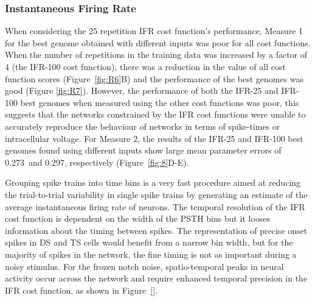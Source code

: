 \subsubsection{Instantaneous Firing Rate }\label{sec:GA:inst-firing-rate-summ}

 When considering the 25
repetition IFR cost function's performance, Measure 1 for the best genome
obtained with different inputs was poor for all cost functions. When the number
of repetitions in the training data was increased by a factor of 4 (the IFR-100
cost function), there was a reduction in the value of all cost function scores
(Figure~\ref{fig:R6}B) and the performance of the best genomes was good (Figure
\ref{fig:R7}). However, the performance of both the IFR-25 and IFR-100 best
genomes when measured using the other cost functions was poor, this suggests
that the networks constrained by the IFR cost functions were unable to
accurately reproduce the behaviour of networks in terms of spike-times or
intracellular voltage. %
For Measure 2, the results of the IFR-25 and IFR-100 best genomes found using
different inputs show large mean parameter errors of 0.273~and 0.297,
respectively (Figure~\ref{fig:8}D-E).

\medskip{}

Grouping spike trains into time bins is a very fast procedure aimed at reducing
the trial-to-trial variability in single spike trains by generating an estimate
of the average instantaneous firing rate of neurons. The temporal resolution of
the IFR cost function is dependent on the width of the PSTH bins but it looses
information about the timing between spikes.  The representation of precise
onset spikes in DS and TS cells would benefit from a narrow bin width, but for
the majority of spikes in the network, the fine timing is not as important
during a noisy stimulus.  For the frozen notch noise, spatio-temporal peaks in
neural activity occur across the network and require enhanced temporal precision
in the IFR cost function, as shown in Figure~\ref{}.

